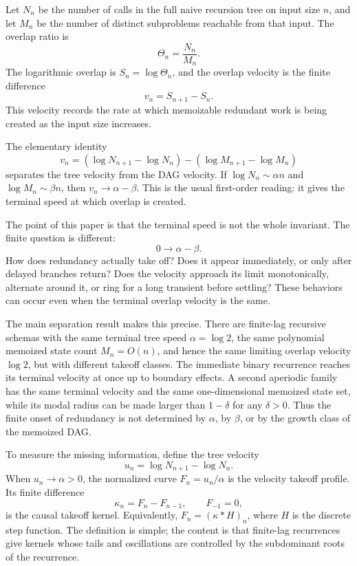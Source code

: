 \documentclass[10pt,twocolumn]{article}
\begin{document}
Let \(N_n\) be the number of calls in the full naive recursion tree on input size \(n\), and let \(M_n\) be the number of distinct subproblems reachable from that input.  The overlap ratio is
\[
        \Theta_n=\frac{N_n}{M_n}.
\]
The logarithmic overlap is \(S_n=\log\Theta_n\), and the overlap velocity is the finite difference
\[
        v_n=S_{n+1}-S_n.
\]
This velocity records the rate at which memoizable redundant work is being created as the input size increases.

The elementary identity
\[
        v_n
        =
        (\log N_{n+1}-\log N_n)
        -
        (\log M_{n+1}-\log M_n)
\]
separates the tree velocity from the DAG velocity.  If \(\log N_n\sim\alpha n\) and \(\log M_n\sim\beta n\), then \(v_n\to\alpha-\beta\).  This is the usual first-order reading: it gives the terminal speed at which overlap is created.

The point of this paper is that the terminal speed is not the whole invariant.  The finite question is different:
\[
        0 \longrightarrow \alpha-\beta.
\]
How does redundancy actually take off?  Does it appear immediately, or only after delayed branches return?  Does the velocity approach its limit monotonically, alternate around it, or ring for a long transient before settling?  These behaviors can occur even when the terminal overlap velocity is the same.

The main separation result makes this precise.  There are finite-lag recursive schemas with the same terminal tree speed \(\alpha=\log2\), the same polynomial memoized state count \(M_n=O(n)\), and hence the same limiting overlap velocity \(\log2\), but with different takeoff classes.  The immediate binary recurrence reaches its terminal velocity at once up to boundary effects.  A second aperiodic family has the same terminal velocity and the same one-dimensional memoized state set, while its modal radius can be made larger than \(1-\delta\) for any \(\delta>0\).  Thus the finite onset of redundancy is not determined by \(\alpha\), by \(\beta\), or by the growth class of the memoized DAG.

To measure the missing information, define the tree velocity
\[
        u_n=\log N_{n+1}-\log N_n.
\]
When \(u_n\to\alpha>0\), the normalized curve \(F_n=u_n/\alpha\) is the velocity takeoff profile.  Its finite difference
\[
        \kappa_n=F_n-F_{n-1},\qquad F_{-1}=0,
\]
is the causal takeoff kernel.  Equivalently, \(F_n=(\kappa*H)_n\), where \(H\) is the discrete step function.  The definition is simple; the content is that finite-lag recurrences give kernels whose tails and oscillations are controlled by the subdominant roots of the recurrence.
\end{document}
